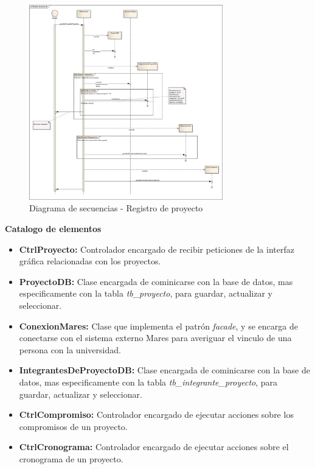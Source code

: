 \documentclass[12pt,oneside,letterpaper]{report}
\begin{document}
\begin{figure}[h!]
  \centering
    \includegraphics[width=0.75\textwidth]{./img/img16.png}
  \caption{Diagrama de secuencias - Registro de proyecto}
\end{figure}

\textbf{Catalogo de elementos}

\begin{itemize}
 \item \textbf{CtrlProyecto:} Controlador encargado de recibir peticiones de la interfaz gráfica relacionadas con los proyectos.
 \item \textbf{ProyectoDB:} Clase encargada de cominicarse con la base de datos, mas especificamente con la tabla \textit{tb\_proyecto}, para guardar, actualizar y seleccionar.
 \item \textbf{ConexionMares:} Clase que implementa el patrón \textit{facade}, y se encarga de conectarse con el sistema externo Mares para averiguar el vinculo de una persona con la universidad.
 \item \textbf{IntegrantesDeProyectoDB:} Clase encargada de cominicarse con la base de datos, mas especificamente con la tabla \textit{tb\_integrante\_proyecto}, para guardar, actualizar y seleccionar.
 \item \textbf{CtrlCompromiso:} Controlador encargado de ejecutar acciones sobre los compromisos de un proyecto.
 \item \textbf{CtrlCronograma:} Controlador encargado de ejecutar acciones sobre el cronograma de un proyecto.
\end{itemize}
\end{document}
